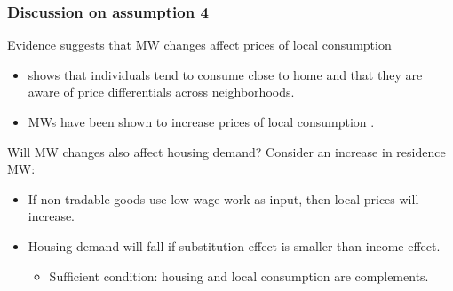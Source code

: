 \documentclass[aspectratio=169, t]{beamer}
\begin{document}
\begin{frame}[label = discuss4]
    \frametitle{Discussion on assumption 4}
    

	Evidence suggests that MW changes affect prices of local consumption
    \begin{itemize}
		\vspace{1mm}
        \item \textcite{MiyauchiEtAl2021} shows that individuals tend to consume close to home and that 
        they are aware of price differentials across neighborhoods.
		\vspace{1mm}
        \item MWs have been shown to increase prices of local consumption 
        \parencite[e.g.,][]{AllegrettoReich2018, LeungForthcoming}.
    \end{itemize}

    \pause 
    \vspace{2mm}

    Will MW changes also affect housing demand? Consider an increase in residence MW:
    \begin{itemize}
		\vspace{1mm}
        \item If non-tradable goods use low-wage work as input, then local prices will increase.
		\vspace{1mm}
		\item Housing demand will fall if substitution effect is smaller than income effect.
		\begin{itemize}
			\item Sufficient condition: housing and local consumption are complements.
		\end{itemize}
    \end{itemize}

	\hyperlink{microfound}{}  
\end{frame}
\end{document}
